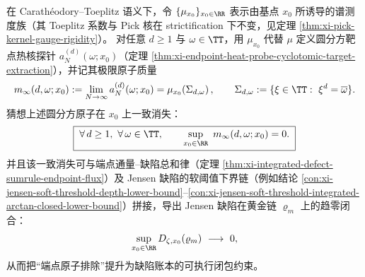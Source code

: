 \begin{conjecture}[圆分方原子消失与端点缺陷链的可审计闭合]\label{conj:xi-cyclotomic-atom-vanishing-jensen-defect-closure}
在 Carath\'eodory--Toeplitz 语义下，令 \(\{\mu_{x_0}\}_{x_0\in\RR}\) 表示由基点 \(x_0\) 所诱导的谱测度族（其 Toeplitz 系数与 Pick 核在 strictification 下不变，见定理 \ref{thm:xi-pick-kernel-gauge-rigidity}）。
对任意 \(d\ge 1\) 与 \(\omega\in\TT\)，用 \(\mu_{x_0}\) 代替 \(\mu\) 定义圆分方靶点热核探针 \(a_N^{(d)}(\omega;x_0)\)（定理 \ref{thm:xi-endpoint-heat-probe-cyclotomic-target-extraction}），并记其极限原子质量
\[
m_\infty(d,\omega;x_0)
:=\lim_{N\to\infty}a_N^{(d)}(\omega;x_0)
=\mu_{x_0}\!\left(\Sigma_{d,\omega}\right),
\qquad
\Sigma_{d,\omega}:=\{\xi\in\TT:\ \xi^{d}=\overline{\omega}\}.
\]
猜想上述圆分方原子在 \(x_0\) 上一致消失：
\[
\boxed{\;
\forall\,d\ge 1,\ \forall\,\omega\in\TT,\qquad
\sup_{x_0\in\RR}\ m_\infty(d,\omega;x_0)=0.\;}
\]
并且该一致消失可与端点通量--缺陷总和律（定理 \ref{thm:xi-integrated-defect-sumrule-endpoint-flux}）及 Jensen 缺陷的软阈值下界链（例如结论 \ref{con:xi-jensen-soft-threshold-depth-lower-bound}--\ref{con:xi-jensen-soft-threshold-integrated-arctan-closed-lower-bound}）拼接，导出 Jensen 缺陷在黄金链 \(\varrho_m\) 上的趋零闭合：
\[
\sup_{x_0\in\RR}D_{\zeta,x_0}(\varrho_m)\ \longrightarrow\ 0,
\]
从而把“端点原子排除”提升为缺陷账本的可执行闭包约束。
\end{conjecture}

\endinput


